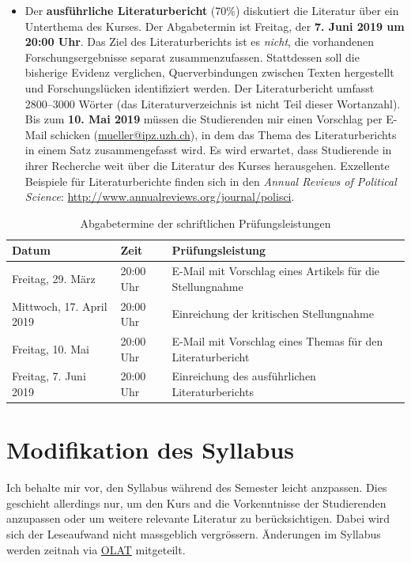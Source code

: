 \documentclass[abstract=on,parskip=full,headings=standardclasses,fontsize=11pt,paper=a4]{scrartcl}
\begin{document}
\begin{itemize}
\item Der \textbf{ausführliche Literaturbericht} (70\%) diskutiert die Literatur über ein Unterthema des Kurses. Der Abgabetermin ist Freitag, der \textbf{7. Juni 2019 um 20:00 Uhr}.  Das Ziel des Literaturberichts ist es \textit{nicht}, die vorhandenen Forschungsergebnisse separat  zusammenzufassen. Stattdessen soll die bisherige Evidenz verglichen,  Querverbindungen zwischen Texten hergestellt und Forschungslücken identifiziert werden. Der Literaturbericht umfasst 2800--3000 Wörter (das Literaturverzeichnis ist  nicht Teil dieser Wortanzahl). Bis zum \textbf{10. Mai 2019} müssen die Studierenden mir einen Vorschlag per E-Mail schicken (\href{mailto:mueller@ipz.uzh.ch}{mueller@ipz.uzh.ch}), in dem das Thema des Literaturberichts in einem Satz zusammengefasst wird. Es wird erwartet, dass Studierende in ihrer Recherche weit über die Literatur des Kurses herausgehen. Exzellente Beispiele für Literaturberichte finden sich in den \textit{Annual Reviews of Political Science}: \url{http://www.annualreviews.org/journal/polisci}.


\end{itemize}


\begin{table}[h] \centering \onehalfspacing \small
\caption*{Abgabetermine der schriftlichen Prüfungsleistungen}
\begin{tabular}{ l l l} 
\toprule
Datum &  Zeit & Prüfungsleistung \\
\midrule
Freitag, 29. März  & 20:00 Uhr &  E-Mail mit Vorschlag eines Artikels für die Stellungnahme  \\
Mittwoch, 17. April 2019 & 20:00 Uhr & Einreichung der kritischen Stellungnahme  \\
Freitag, 10. Mai  & 20:00 Uhr & E-Mail mit Vorschlag eines Themas für den Literaturbericht \\
Freitag, 7. Juni 2019 & 20:00 Uhr & Einreichung des ausführlichen Literaturberichts  \\
\bottomrule
\end{tabular}
\end{table}

\section*{Modifikation des Syllabus}

Ich behalte mir vor, den Syllabus während des Semester leicht anzpassen. Dies geschieht allerdings nur, um den Kurs and die Vorkenntnisse der Studierenden anzupassen oder um weitere relevante Literatur zu berücksichtigen. Dabei wird sich der Leseaufwand nicht massgeblich vergrössern. Änderungen im Syllabus werden zeitnah via \href{https://lms.uzh.ch/url/RepositoryEntry/16539681116?guest=true&lang=en}{OLAT} mitgeteilt. 
\end{document}
